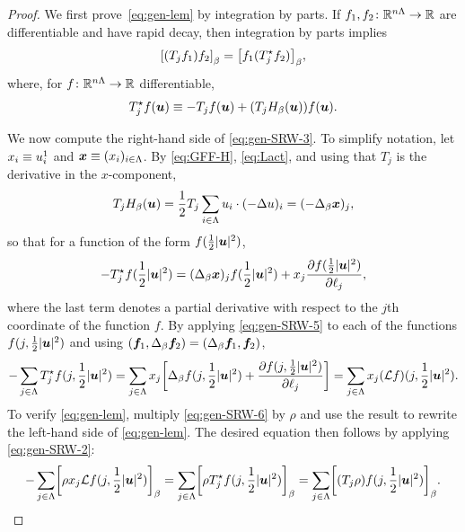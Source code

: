 \documentclass[11pt,a4paper]{article}
\begin{document}
\begin{proof}
  We first prove~\eqref{eq:gen-lem} by integration by parts.  If
  $f_{1},f_{2}\colon \mathbb{R}^{n\Lambda}\to \mathbb{R}$ are differentiable and have
  rapid decay, then integration by parts implies
  \begin{equation}
    \label{eq:gen-SRW-2}
    \cb{(T_{j}f_{1}) f_{2}}_{\beta} = \cb{f_{1} (T^{\star}_{j}f_{2})}_{\beta},
  \end{equation}
  where, for $f\colon\mathbb{R}^{n\Lambda}\to\mathbb{R}$ differentiable,
  \begin{equation}
    \label{eq:gen-SRW-3}
    T^{\star}_{j}f(\boldsymbol{u}) \equiv -T_{j}f(\boldsymbol{u}) + (T_{j}H_{\beta}(\boldsymbol{u}))f(\boldsymbol{u}).
  \end{equation}
  
  We now compute the right-hand side of \eqref{eq:gen-SRW-3}.
  To simplify notation, let $x_{i}\equiv u^{1}_{i}$ and $\boldsymbol{x} \equiv (x_{i})_{i\in\Lambda}$.
  By \eqref{eq:GFF-H}, \eqref{eq:Lact}, and using that $T_j$ is the derivative in the $x$-component,
  \begin{equation}
    \label{eq:gen-SRW-4}
    T_{j}H_{\beta}(\boldsymbol{u})
    =\frac12 T_j \sum_{i\in\Lambda} u_i \cdot (-\Delta u)_i
    =  (-\Delta_{\beta}\boldsymbol{x})_{j},
  \end{equation}
  so that for a function of the form $f(\frac{1}{2}|\boldsymbol{u}|^{2})$,
  \begin{equation}
    \label{eq:gen-SRW-5}
    -T^{\star}_{j}f(\frac{1}{2}|\boldsymbol{u}|^{2}) =
    (\Delta_{\beta}\boldsymbol{x})_{j}f(\frac{1}{2}|\boldsymbol{u}|^{2}) +
    x_{j}\frac{\partial f(\frac{1}{2}|\boldsymbol{u}|^{2})}{\partial \ell_{j}},
  \end{equation}
  where the last term denotes a partial derivative with respect to the
  $j$th coordinate of the function $f$. By applying
  \eqref{eq:gen-SRW-5} to each of the functions
  $f(j,\frac{1}{2}|\boldsymbol{u}|^{2})$ and using
  $(\boldsymbol{f}_{1},\Delta_{\beta}\boldsymbol{f}_{2})=(\Delta_{\beta}\boldsymbol{f}_{1},\boldsymbol{f}_{2})$,
  \begin{equation}
    \label{eq:gen-SRW-6}
    -\sum_{j\in\Lambda}T^{\star}_{j}f(j,\frac{1}{2}|\V{u}|^{2}) 
    =
    \sum_{j\in\Lambda}x_{j}
    \cb{ \Delta_{\beta}f(j,\frac{1}{2}|\V{u}|^{2}) +
      \ddp{f(j,\frac{1}{2}|\V{u}|^{2})}{\ell_{j}}}
    =
    \sum_{j\in\Lambda}x_{j}(\cL f)(j,\frac{1}{2}|\V{u}|^{2}).
  \end{equation}
  To verify \eqref{eq:gen-lem},
  multiply
  \eqref{eq:gen-SRW-6} by $\rho$ and use the result to rewrite
  the left-hand side of \eqref{eq:gen-lem}. The desired equation
  then follows by applying \eqref{eq:gen-SRW-2}:
  \begin{equation*}
    -\sum_{j\in\Lambda}\cb{\rho x_{j} \cL f(j, \frac{1}{2} |\V{u}|^{2})}_{\beta}
    = 
    \sum_{j\in\Lambda}\cb{ \rho T^{\star}_{j}f(j,\frac{1}{2} |\V{u}|^{2})}_{\beta}
    = 
    \sum_{j\in\Lambda}\cb{ (T_{j}\rho)
      f(j,\frac{1}{2}|\V{u}|^{2})}_{\beta}.
  \end{equation*}


\end{proof}
\end{document}
